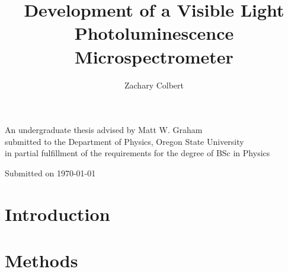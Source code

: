 \documentclass[12pt]{article}
\title{Development of a Visible Light Photoluminescence Microspectrometer }
\author{Zachary Colbert}
\renewenvironment{abstract}
 {%
  \global\setbox\abstractbox=\vtop\bgroup
  \begin{center}\bfseries\abstractname\end{center}%
 }
 {\par\egroup}
\begin{document}

  \begin{titlepage}
    \begin{center}
        \vspace*{1cm}
  
        \textbf{\thetitle}
  
        \vspace{3cm}
  
        \textbf{\theauthor}
  
        \vspace{10cm}
  
        An undergraduate thesis advised by Matt W. Graham \\
        submitted to the Department of Physics, Oregon State University \\
        in partial fulfillment of the requirements for the degree of BSc in Physics
  
        \vfill
  
        Submitted on \today
  
    \end{center}
  \end{titlepage}

  

  \tableofcontents
  \listoffigures


  \section{Introduction}\label{chap:intro}
  

  

  \section{Methods}\label{chap:methods}
  
\end{document}
